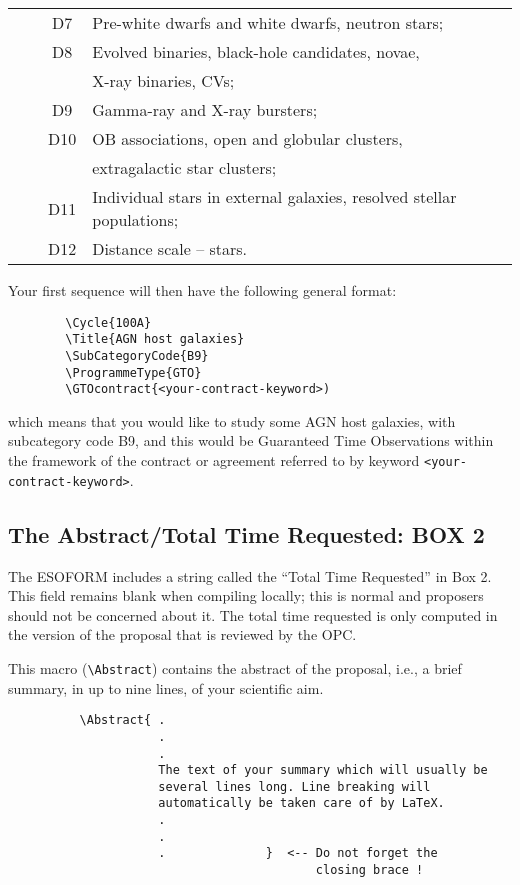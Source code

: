 \documentclass{article}
\begin{document}
\begin{table}[p]
{\begin{center}
\begin{tabular}{llcl}
       &           & D7 & Pre-white dwarfs and white dwarfs, neutron stars; \\ 
       &           & D8 & Evolved binaries, black-hole candidates, novae, \\ 
       &           &    &  X-ray binaries, CVs; \\
       &           & D9 & Gamma-ray and X-ray bursters; \\
       &           & D10& OB associations, open and globular clusters, \\
       &           &    &  extragalactic star clusters; \\
       &           & D11& Individual stars in external galaxies, resolved stellar populations;\\
       &           & D12& Distance scale -- stars.\\[4pt]
\hline
\end{tabular}
\end{center}
}
\end{table}

Your first sequence will then have the following general format:
\begin{verbatim}
        \Cycle{100A}
        \Title{AGN host galaxies}
        \SubCategoryCode{B9}
        \ProgrammeType{GTO}
        \GTOcontract{<your-contract-keyword>)
\end{verbatim}
\noindent which means that you would like to study some AGN host
galaxies, with subcategory code B9, and this would be Guaranteed Time
Observations within the framework of the contract or agreement
referred to by keyword \verb|<your-contract-keyword>|.


\subsection{The Abstract/Total Time Requested:  {\bf BOX 2}}

The ESOFORM includes a string called the
``Total Time Requested'' in Box 2. 
This field remains blank when compiling locally; this 
is normal and proposers should not be concerned about it.
The total time requested is only computed in the version of the proposal 
that is reviewed by the OPC. 

This macro (\verb|\Abstract|) contains the  abstract of the  proposal,
i.e., a brief summary, in up to nine lines, of your scientific aim.
\begin{verbatim}
          \Abstract{ .
                     .
                     .
                     The text of your summary which will usually be 
                     several lines long. Line breaking will  
                     automatically be taken care of by LaTeX.
                     .
                     .
                     .              }  <-- Do not forget the
                                           closing brace !
\end{verbatim}
\end{document}

